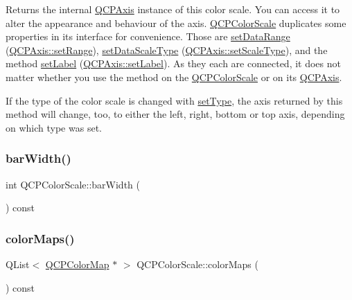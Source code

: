 Returns the internal \hyperlink{class_q_c_p_axis}{Q\+C\+P\+Axis} instance of this color scale. You can access it to alter the appearance and behaviour of the axis. \hyperlink{class_q_c_p_color_scale}{Q\+C\+P\+Color\+Scale} duplicates some properties in its interface for convenience. Those are \hyperlink{class_q_c_p_color_scale_abe88633003a26d1e756aa74984587fef}{set\+Data\+Range} (\hyperlink{class_q_c_p_axis_aebdfea5d44c3a0ad2b4700cd4d25b641}{Q\+C\+P\+Axis\+::set\+Range}), \hyperlink{class_q_c_p_color_scale_aeb6107d67dd7325145b2498abae67fc3}{set\+Data\+Scale\+Type} (\hyperlink{class_q_c_p_axis_adef29cae617af4f519f6c40d1a866ca6}{Q\+C\+P\+Axis\+::set\+Scale\+Type}), and the method \hyperlink{class_q_c_p_color_scale_aee124ae8396320cacf8276e9a0fbb8ce}{set\+Label} (\hyperlink{class_q_c_p_axis_a33bcc382c111c9f31bb0687352a2dea4}{Q\+C\+P\+Axis\+::set\+Label}). As they each are connected, it does not matter whether you use the method on the \hyperlink{class_q_c_p_color_scale}{Q\+C\+P\+Color\+Scale} or on its \hyperlink{class_q_c_p_axis}{Q\+C\+P\+Axis}.

If the type of the color scale is changed with \hyperlink{class_q_c_p_color_scale_a1bf9bdb291927c422dd66b404b206f1f}{set\+Type}, the axis returned by this method will change, too, to either the left, right, bottom or top axis, depending on which type was set. \mbox{\label{class_q_c_p_color_scale_ae02ab8e4bfaa919577992e73242f491f}} 
\subsubsection{\texorpdfstring{bar\+Width()}{barWidth()}}
{\footnotesize\ttfamily int Q\+C\+P\+Color\+Scale\+::bar\+Width (\begin{DoxyParamCaption}{ }\end{DoxyParamCaption}) const\hspace{0.3cm}{\ttfamily [inline]}}

\mbox{\label{class_q_c_p_color_scale_a556adc6b0216ebc1cc4317c541956d06}} 
\subsubsection{\texorpdfstring{color\+Maps()}{colorMaps()}}
{\footnotesize\ttfamily Q\+List$<$ \hyperlink{class_q_c_p_color_map}{Q\+C\+P\+Color\+Map} $\ast$ $>$ Q\+C\+P\+Color\+Scale\+::color\+Maps (\begin{DoxyParamCaption}{ }\end{DoxyParamCaption}) const}

